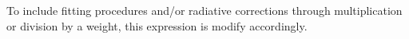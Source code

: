 To include fitting procedures and/or radiative corrections through multiplication or division by a weight, this expression is modify accordingly.

%
